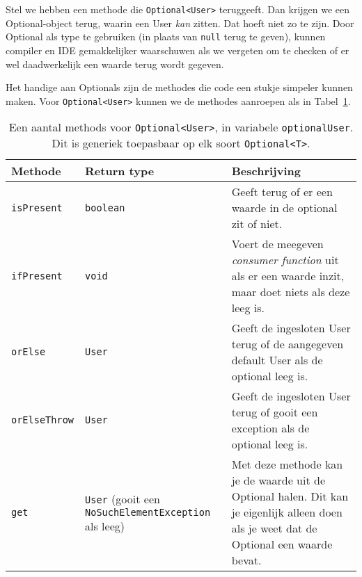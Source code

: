 Stel we hebben een methode die \texttt{Optional<User>} teruggeeft. Dan krijgen we 
een Optional-object terug, waarin een User \textit{kan} zitten. Dat hoeft niet zo 
te zijn. Door Optional als type te gebruiken (in plaats van \texttt{null} terug te geven),
kunnen compiler en IDE gemakkelijker waarschuwen als we vergeten om te checken of 
er wel daadwerkelijk een waarde terug wordt gegeven.

Het handige aan Optionals zijn de methodes die code een stukje simpeler kunnen maken.
Voor \texttt{Optional<User>} kunnen we de methodes aanroepen als in Tabel~\ref{table:optional-methods}.

\begin{table}[H]
    \centering
    \begin{tabularx}{\textwidth}{
        |>{\raggedright}l|>{\raggedright}X|>{\raggedright\arraybackslash}X|
    }
    \hline
    \textbf{Methode} 
    & \textbf{Return type} 
    & \textbf{Beschrijving} 
    \\ \hline
        
    \texttt{isPresent}
    & \texttt{boolean}
    & Geeft terug of er een waarde in de optional zit of niet.
    \\ \hline

    \texttt{ifPresent}
    & \texttt{void}
    & Voert de meegeven \textit{consumer function} uit als er een waarde inzit, maar 
    doet niets als deze leeg is.
    \\ \hline

    \texttt{orElse}
    & \texttt{User}
    & Geeft de ingesloten User terug of de aangegeven default User als de optional leeg is.
    \\ \hline

    \texttt{orElseThrow}
    & \texttt{User}
    & Geeft de ingesloten User terug of gooit een exception als de optional leeg is.
    \\ \hline

    \texttt{get}
    & \texttt{User} (gooit een \texttt{NoSuchElementException} als leeg)
    & Met deze methode kan je de waarde uit de Optional halen. 
    Dit kan je eigenlijk alleen doen als je weet dat de Optional een waarde bevat. 
    \\ \hline

    \end{tabularx}
    \caption{Een aantal methods voor \texttt{Optional<User>}, in variabele \texttt{optionalUser}.
    Dit is generiek toepasbaar op elk soort \texttt{Optional<T>}.}
    \label{table:optional-methods}
    \centering
\end{table}

